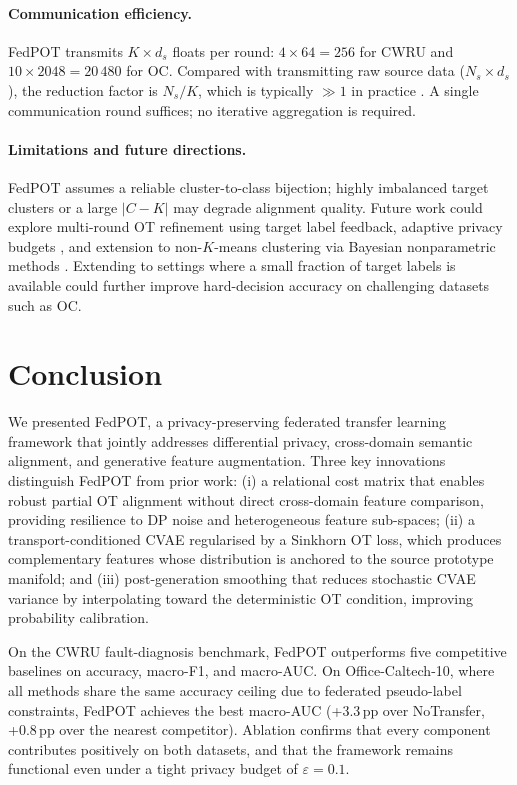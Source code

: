 \documentclass[a4paper,fleqn]{cas-sc}
\begin{document}
\paragraph{Communication efficiency.}
FedPOT transmits $K \times d_s$ floats per round:
$4 \times 64 = 256$ for CWRU and $10 \times 2048 = 20\,480$ for OC.
Compared with transmitting raw source data ($N_s \times d_s$), the
reduction factor is $N_s/K$, which is typically $\gg 1$ in practice
\citep{Konecny2016}.
A single communication round suffices; no iterative aggregation is required.

\paragraph{Limitations and future directions.}
FedPOT assumes a reliable cluster-to-class bijection; highly imbalanced
target clusters or a large $|C - K|$ may degrade alignment quality.
Future work could explore multi-round OT refinement using target label
feedback, adaptive privacy budgets \citep{Balle2018}, and extension to
non-$K$-means clustering via Bayesian nonparametric methods
\citep{Yurochkin2019}.
Extending to settings where a small fraction of target labels is
available \citep{Pan2010} could further improve hard-decision accuracy
on challenging datasets such as OC.

\section{Conclusion}
\label{sec:conc}

We presented FedPOT, a privacy-preserving federated transfer learning
framework that jointly addresses differential privacy, cross-domain
semantic alignment, and generative feature augmentation.
Three key innovations distinguish FedPOT from prior work:
(i) a relational cost matrix that enables robust partial OT alignment
without direct cross-domain feature comparison, providing resilience
to DP noise and heterogeneous feature sub-spaces;
(ii) a transport-conditioned CVAE regularised by a Sinkhorn OT loss,
which produces complementary features whose distribution is anchored to
the source prototype manifold;
and (iii) post-generation smoothing that reduces stochastic CVAE variance
by interpolating toward the deterministic OT condition, improving
probability calibration.

On the CWRU fault-diagnosis benchmark, FedPOT outperforms five
competitive baselines on accuracy, macro-F1, and macro-AUC.
On Office-Caltech-10, where all methods share the same accuracy ceiling
due to federated pseudo-label constraints, FedPOT achieves the best
macro-AUC (+3.3\,pp over NoTransfer, +0.8\,pp over the nearest
competitor).
Ablation confirms that every component contributes positively on
both datasets, and that the framework remains functional even under
a tight privacy budget of $\varepsilon=0.1$.
\end{document}
